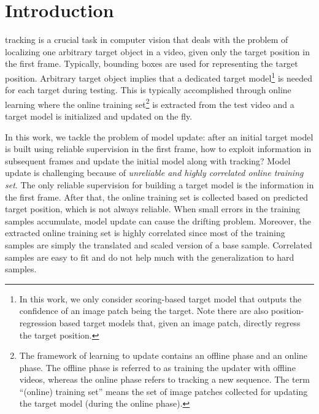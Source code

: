 \documentclass[journal]{IEEEtran}
\begin{document}
\section{Introduction}
 tracking is a crucial task in computer vision that deals with the problem of localizing one arbitrary target object in a video, given only the target position in the first frame.  Typically, bounding boxes are used for representing the target position. Arbitrary target object implies that a dedicated target model\footnote{In this work, we only consider scoring-based target model that outputs the confidence of an image patch being the target. Note there are also position-regression based target models that, given an image patch, directly regress the target position. } is needed for each target during testing. This is typically accomplished through online learning where the online training set\footnote{The framework of learning to update contains an offline phase and an online phase. The offline phase is referred to as training the updater with offline videos, whereas the online phase refers to tracking a new sequence. The term ``(online) training set'' means the set of image patches collected for updating the target model (during the online phase).} is extracted from the test video and a target model is initialized and updated on the fly. 

In this work, we tackle the problem of model update: after an initial target model is built using reliable supervision in the first frame, how to exploit information in subsequent frames and update the initial model along with tracking? Model update is challenging because of \emph{unreliable and highly correlated online training set}. The only reliable supervision for building a target model is the information in the first frame. After that, the online training set is collected based on predicted target position, which is not always reliable. When small errors in the training samples accumulate, model update can cause the drifting problem. Moreover, the extracted online training set is highly correlated since most of the training samples are simply the translated and scaled version of a base sample. Correlated samples are easy to fit and do not help much with the generalization to hard samples.
\end{document}
